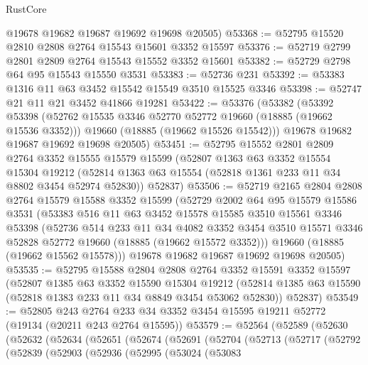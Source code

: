\begin{lexlean}{RustCore}
\begin{coremodule}
      @19678
      @19682
      @19687
      @19692
      @19698
      @20505)
@53368 := @52795 @15520 @2810 @2808 @2764 @15543 @15601 @3352 @15597
@53376 := @52719 @2799 @2801 @2809 @2764 @15543 @15552 @3352 @15601
@53382 := @52729 @2798 @64 @95 @15543 @15550 @3531
@53383 := @52736 @231
@53392 := @53383 @1316 @11 @63 @3452 @15542 @15549 @3510 @15525 @3346
@53398 := @52747 @21 @11 @21 @3452 @41866 @19281
@53422 := @53376
    (@53382
      (@53392
        @53398
        (@52762 @15535 @3346 @52770 @52772 @19660 (@18885 (@19662 @15536 @3352)))
        @19660
        (@18885 (@19662 @15526 @15542)))
      @19678
      @19682
      @19687
      @19692
      @19698
      @20505)
@53451 := @52795
    @15552
    @2801
    @2809
    @2764
    @3352
    @15555
    @15579
    @15599
    (@52807
      @1363
      @63
      @3352
      @15554
      @15304
      @19212
      (@52814 @1363 @63 @15554 (@52818 @1361 @233 @11 @34 @8802 @3454 @52974 @52830))
      @52837)
@53506 := @52719
    @2165
    @2804
    @2808
    @2764
    @15579
    @15588
    @3352
    @15599
    (@52729
      @2002
      @64
      @95
      @15579
      @15586
      @3531
      (@53383
        @516
        @11
        @63
        @3452
        @15578
        @15585
        @3510
        @15561
        @3346
        @53398
        (@52736
          @514
          @233
          @11
          @34
          @4082
          @3352
          @3454
          @3510
          @15571
          @3346
          @52828
          @52772
          @19660
          (@18885 (@19662 @15572 @3352)))
        @19660
        (@18885 (@19662 @15562 @15578)))
      @19678
      @19682
      @19687
      @19692
      @19698
      @20505)
@53535 := @52795
    @15588
    @2804
    @2808
    @2764
    @3352
    @15591
    @3352
    @15597
    (@52807
      @1385
      @63
      @3352
      @15590
      @15304
      @19212
      (@52814 @1385 @63 @15590 (@52818 @1383 @233 @11 @34 @8849 @3454 @53062 @52830))
      @52837)
@53549 := @52805
    @243
    @2764
    @233
    @34
    @3352
    @3454
    @15595
    @19211
    @52772
    (@19134 (@20211 @243 @2764 @15595))
@53579 := @52564
    (@52589
      (@52630
        (@52632
          (@52634
            (@52651
              (@52674
                (@52691
                  (@52704
                    (@52713
                      (@52717
                        (@52792
                          (@52839
                            (@52903
                              (@52936
                                (@52995
                                  (@53024
                                    (@53083

\end{coremodule}
\end{lexlean}
